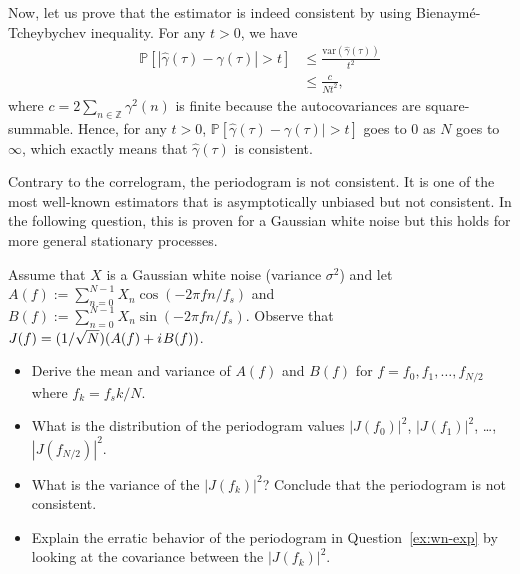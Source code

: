 \documentclass[11pt]{article}
\begin{document}
\begin{solution}
    Now, let us prove that the estimator is indeed consistent by using Bienaymé-Tcheybychev inequality. For any $t>0$, we have
    \begin{equation}
        \begin{split}
            \mathbb{P}[|\hat{\gamma}(\tau)-\gamma(\tau)|>t]&\leq \frac{\text{var}(\hat{\gamma}(\tau))}{t^2}\\
            &\leq \frac{c}{Nt^2},
        \end{split}
    \end{equation}
    where $c=2\sum_{n\in\mathbb{Z}}\gamma^2(n)$ is finite because the autocovariances are square-summable. Hence, for any $t > 0$, $\mathbb{P}[\hat{\gamma}(\tau)-\gamma(\tau)|>t]$ goes to $0$ as $N$ goes to $\infty$, which exactly means that $\hat{\gamma}(\tau)$ is consistent.
\end{solution}

Contrary to the correlogram, the periodogram is not consistent.
It is one of the most well-known estimators that is asymptotically unbiased but not consistent.
In the following question, this is proven for a Gaussian white noise but this holds for more general stationary processes.
\begin{exercise}
    Assume that $X$ is a Gaussian white noise (variance $\sigma^2$) and let $A(f):=\sum_{n=0}^{N-1} X_n \cos(-2\pi f n/f_s)$ and $B(f):=\sum_{n=0}^{N-1} X_n \sin(-2\pi f n/f_s)$.
    Observe that $J(f) = (1/\sqrt{N}) (A(f) + {i\mkern1mu} B(f))$.
    \begin{itemize}
        \item Derive the mean and variance of $A(f)$ and $B(f)$ for $f=f_0, f_1,\dots, f_{N/2}$ where $f_k=f_s k/N$.
        \item What is the distribution of the periodogram values $|J(f_0)|^2$, $|J(f_1)|^2$, \dots, $|J(f_{N/2})|^2$.
        \item What is the variance of the $|J(f_k)|^2$? Conclude that the periodogram is not consistent.
        \item Explain the erratic behavior of the periodogram in Question~\ref{ex:wn-exp} by looking at the covariance between the $|J(f_k)|^2$.
    \end{itemize}

\end{exercise}
\end{document}
